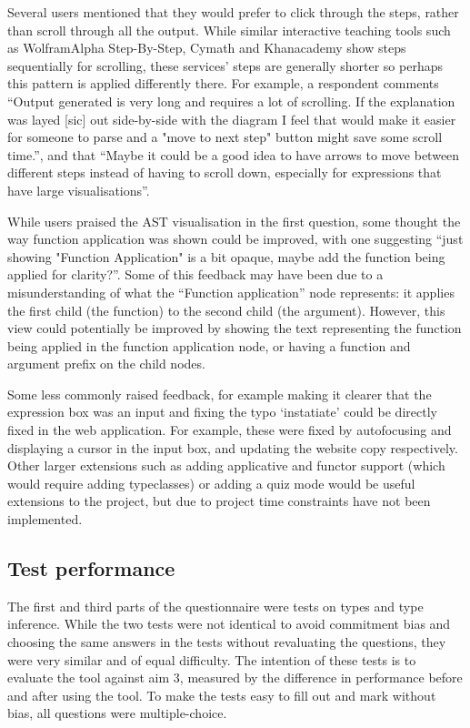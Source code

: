 \documentclass[a4paper,fleqn,oneside,12pt]{report}
\begin{document}
Several users mentioned that they would prefer to click through the steps, rather than scroll through all the output. While similar interactive teaching tools such as WolframAlpha Step-By-Step, Cymath and Khanacademy show steps sequentially for scrolling, these services’ steps are generally shorter so perhaps this pattern is applied differently there. For example, a respondent comments “Output generated is very long and requires a lot of scrolling. If the explanation was layed [sic] out side-by-side with the diagram I feel that would make it easier for someone to parse and a "move to next step" button might save some scroll time.”, and that “Maybe it could be a good idea to have arrows to move between different steps instead of having to scroll down, especially for expressions that have large visualisations”.

While users praised the AST visualisation in the first question, some thought the way function application was shown could be improved, with one suggesting “just showing "Function Application" is a bit opaque, maybe add the function being applied for clarity?”. Some of this feedback may have been due to a misunderstanding of what the “Function application” node represents: it applies the first child (the function) to the second child (the argument). However, this view could potentially be improved by showing the text representing the function being applied in the function application node, or having a function and argument prefix on the child nodes.

Some less commonly raised feedback, for example making it clearer that the expression box was an input and fixing the typo ‘instatiate’ could be directly fixed in the web application. For example, these were fixed by autofocusing and displaying a cursor in the input box, and updating the website copy respectively. Other larger extensions such as adding applicative and functor support (which would require adding typeclasses) or adding a quiz mode would be useful extensions to the project, but due to project time constraints have not been implemented.

\subsection{Test performance}\label{id:h.cn0p90nrqrmi}

The first and third parts of the questionnaire were tests on types and type inference. While the two tests were not identical to avoid commitment bias and choosing the same answers in the tests without revaluating the questions, they were very similar and of equal difficulty. The intention of these tests is to evaluate the tool against aim 3, measured by the difference in performance before and after using the tool. To make the tests easy to fill out and mark without bias, all questions were multiple-choice.
\end{document}

